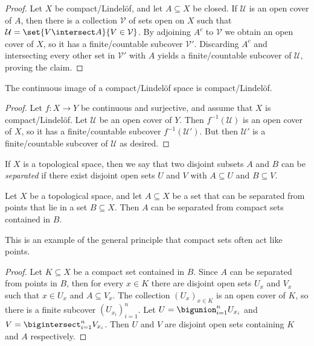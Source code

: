 \documentclass[article, a4paper, 11pt, oneside]{memoir}
\numberwithin{equation}{chapter}
\newcommand{\preim}{^{-1}}
\newcommand{\calU}{\mathcal{U}}
\newcommand{\calV}{\mathcal{V}}
\begin{document}
\begin{proof}
    Let $X$ be compact/Lindelöf, and let $A \subseteq X$ be closed. If $\calU$ is an open cover of $A$, then there is a collection $\calV$ of sets open on $X$ such that $\calU = \set{V \intersect A}{V \in \calV}$. By adjoining $A^c$ to $\calV$ we obtain an open cover of $X$, so it has a finite/countable subcover $\calV'$. Discarding $A^c$ and intersecting every other set in $\calV'$ with $A$ yields a finite/countable subcover of $\calU$, proving the claim.
\end{proof}


\begin{proposition}
    The continuous image of a compact/Lindelöf space is compact/Lindelöf.
\end{proposition}

\begin{proof}
    Let $f \colon X \to Y$ be continuous and surjective, and assume that $X$ is compact/Lindelöf. Let $\calU$ be an open cover of $Y$. Then $f\preim(\calU)$ is an open cover of $X$, so it has a finite/countable subcover $f\preim(\calU')$. But then $\calU'$ is a finite/countable subcover of $\calU$ as desired.
\end{proof}


If $X$ is a topological space, then we say that two disjoint subsets $A$ and $B$ can be \emph{separated} if there exist disjoint open sets $U$ and $V$ with $A \subseteq U$ and $B \subseteq V$.

\begin{lemma}
    \label{thm:separating_from_compacts}
    Let $X$ be a topological space, and let $A \subseteq X$ be a set that can be separated from points that lie in a set $B \subseteq X$. Then $A$ can be separated from compact sets contained in $B$.
\end{lemma}
%
This is an example of the general principle that compact sets often act like points.

\begin{proof}
    Let $K \subseteq X$ be a compact set contained in $B$. Since $A$ can be separated from points in $B$, then for every $x \in K$ there are disjoint open sets $U_x$ and $V_x$ such that $x \in U_x$ and $A \subseteq V_x$. The collection $(U_x)_{x \in K}$ is an open cover of $K$, so there is a finite subcover $(U_{x_i})_{i=1}^n$. Let $U = \bigunion_{i=1}^n U_{x_i}$ and $V = \bigintersect_{i=1}^n V_{x_i}$. Then $U$ and $V$ are disjoint open sets containing $K$ and $A$ respectively.
\end{proof}
\end{document}
